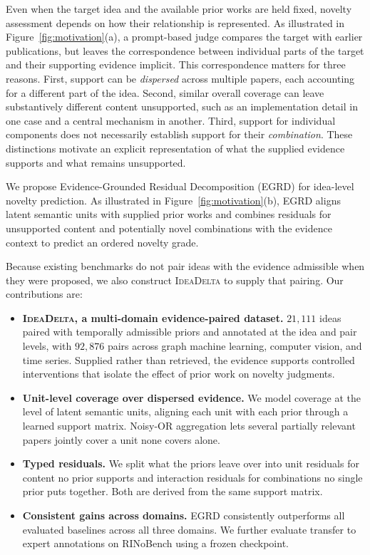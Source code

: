 Even when the target idea and the available prior works are held fixed,
novelty assessment depends on how their relationship is represented. As
illustrated in Figure~\ref{fig:motivation}(a), a prompt-based judge compares
the target with earlier publications, but leaves the correspondence between
individual parts of the target and their supporting evidence implicit. This
correspondence matters for three reasons. First, support can be \emph{dispersed}
across multiple papers, each accounting for a different part of the idea.
Second, similar overall coverage can leave substantively different content
unsupported, such as an implementation detail in one case and a central
mechanism in another. Third, support for individual components does not
necessarily establish support for their \emph{combination}. These distinctions
motivate an explicit representation of what the supplied evidence supports
and what remains unsupported.

We propose Evidence-Grounded Residual Decomposition (EGRD) for idea-level
novelty prediction. As illustrated in Figure~\ref{fig:motivation}(b), EGRD aligns latent semantic
units with supplied prior works and combines residuals for unsupported content
and potentially novel combinations with the evidence context to predict an
ordered novelty grade.

Because
existing benchmarks do not pair ideas with the evidence admissible when they
were proposed, we also construct \textsc{IdeaDelta} to supply that pairing. Our
contributions are:
\begin{itemize}
  \item \textbf{\textsc{IdeaDelta}, a multi-domain evidence-paired dataset.}
  $21{,}111$ ideas paired with temporally admissible priors and annotated at the
  idea and pair levels, with $92{,}876$ pairs across graph machine learning,
  computer vision, and time series. Supplied rather than retrieved, the evidence
  supports controlled interventions that isolate the effect of prior work on
  novelty judgments.
  \item \textbf{Unit-level coverage over dispersed evidence.} We model coverage
  at the level of latent semantic units, aligning each unit with each prior
  through a learned support matrix. Noisy-OR aggregation lets several partially
  relevant papers jointly cover a unit none covers alone.
  \item \textbf{Typed residuals.} We split what the priors leave over into unit
  residuals for content no prior supports and interaction residuals for
  combinations no single prior puts together. Both are derived from the same support matrix.
  \item \textbf{Consistent gains across domains.}
  EGRD consistently outperforms all evaluated baselines across all three
  domains. We further evaluate transfer to expert annotations on RINoBench
  \citep{schopf2026rinobench} using a frozen checkpoint.
\end{itemize}

